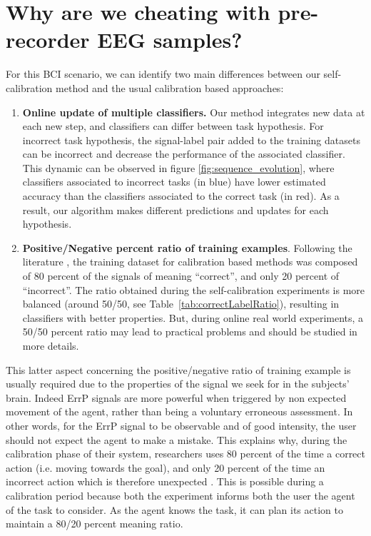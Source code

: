\section{Why are we cheating with pre-recorder EEG samples?}
\label{chapter:bci:cheating}

For this BCI scenario, we can identify two main differences between our self-calibration method and the usual calibration based approaches:
\begin{enumerate}
\item \textbf{Online update of multiple classifiers.} Our method integrates new data at each new step, and classifiers can differ between task hypothesis. For incorrect task hypothesis, the signal-label pair added to the training datasets can be incorrect and decrease the performance of the associated classifier. This dynamic can be observed in figure \ref{fig:sequence_evolution}, where classifiers associated to incorrect tasks (in blue) have lower estimated accuracy than the classifiers associated to the correct task (in red). As a result, our algorithm makes different predictions and updates for each hypothesis.
\item \textbf{Positive/Negative percent ratio of training examples}. Following the literature \cite{chavarriaga2010learning, iturrate2013task}, the training dataset for calibration based methods was composed of 80 percent of the signals of meaning ``correct'', and only 20 percent of ``incorrect''. The ratio obtained during the self-calibration experiments is more balanced (around 50/50, see Table~\ref{tab:correctLabelRatio}), resulting in classifiers with better properties. But, during online real world experiments, a 50/50 percent ratio may lead to practical problems and should be studied in more details.
\end{enumerate}

This latter aspect concerning the positive/negative ratio of training example is usually required due to the properties of the signal we seek for in the subjects' brain. Indeed ErrP signals are more powerful when triggered by non expected movement of the agent, rather than being a voluntary erroneous assessment. In other words, for the ErrP signal to be observable and of good intensity, the user should not expect the agent to make a mistake. This explains why, during the calibration phase of their system, researchers uses 80 percent of the time a correct action (i.e. moving towards the goal), and only 20 percent of the time an incorrect action which is therefore unexpected \cite{chavarriaga2014errare}. This is possible during a calibration period because both the experiment informs both the user the agent of the task to consider. As the agent knows the task, it can plan its action to maintain a 80/20 percent meaning ratio.

